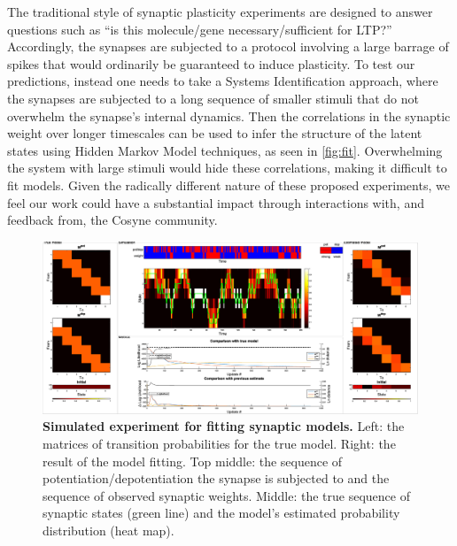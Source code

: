 \documentclass[12pt]{article}
\begin{document}
The traditional style of synaptic plasticity experiments are designed to answer questions such as ``is this molecule/gene necessary/sufficient for LTP?'' Accordingly, the synapses are subjected to a protocol involving a large barrage of spikes that would ordinarily be guaranteed to induce plasticity. To test our predictions, instead one needs to take a Systems Identification approach, where the synapses are subjected to a long sequence of smaller stimuli that do not overwhelm the synapse’s internal dynamics. Then the correlations in the synaptic weight over longer timescales can be used to infer the structure of the latent states using Hidden Markov Model techniques, as seen in \autoref{fig:fit}. Overwhelming the system with large stimuli would hide these correlations, making it difficult to fit models. Given the radically different nature of these proposed experiments, we feel our work could have a substantial impact through interactions with, and feedback from, the Cosyne community.

\begin{figure}[h]
  \centering
  \includegraphics[width=0.99\linewidth]{FitVid939.eps}
  \caption{\small{\textbf{Simulated experiment for fitting synaptic models.} Left: the matrices of transition probabilities for the true model. Right: the result of the model fitting. Top middle: the sequence of potentiation/depotentiation the synapse is subjected to and the sequence of observed synaptic weights. Middle: the true sequence of synaptic states (green line) and the model’s estimated probability distribution (heat map).}}\label{fig:fit}
\end{figure}

\end{document}
